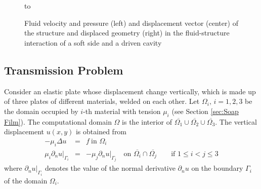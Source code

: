 \documentclass[a4paper,twoside,12pt]{book}
\def\p{\partial}
\def\setS#1{#1\label{sec:#1}}
\def\refSec#1{Section \ref{sec:#1}}
\begin{document}
\begin{figure}

\hbox to 
\begin{center}
\caption{\label{fstruct} Fluid velocity and pressure (left) and displacement vector (center)
of the structure and displaced geometry (right) in the fluid-structure interaction
of a soft side and a driven cavity}
\end{center}
\end{figure}

\subsection{\setS{Transmission Problem}}
Consider an elastic plate whose displacement change vertically,
which is made up of three plates of different materials,
welded on each other.
Let $\Omega_i,\, i=1,2,3$ be the domain occupied by $i$-th material
with tension $\mu_i$ (see \refSec{Soap Film}).
The computational domain $\Omega$ is the interior of
$\overline{\Omega_1}\cup \overline{\Omega_2}\cup \overline{\Omega_3}$.
The vertical displacement $u(x,y)$ is obtained from
\begin{eqnarray}
\label{eqn:transm-1}
-\mu_i\Delta u&=&f~\textrm{in }\Omega_i\\
\label{eqn:transm-2}
\mu_i\p_n u|_{\Gamma_{i}}&=&-\mu_j\p_n u|_{\Gamma_{j}}
\quad \textrm{on }\overline{\Omega_{i}}\cap\overline{\Omega_{j}}
\qquad \textrm{if }1\le i< j\le 3
\end{eqnarray}
where $\p_n u|_{\Gamma_{i}}$ denotes the value of
the normal derivative $\p_n u$ on the boundary $\Gamma_i$ of
the domain $\Omega_i$.
\end{document}
